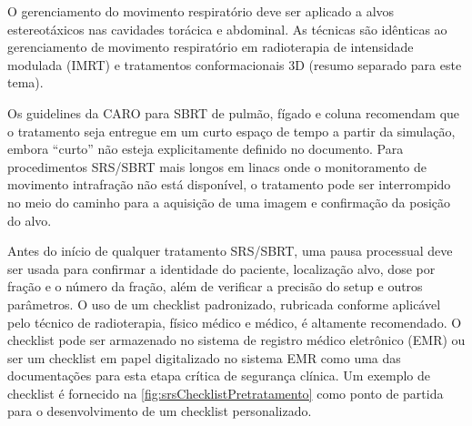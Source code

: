 \documentclass[11pt,a4paper]{article}
\newcounter{exemplo}
\begin{document}
	O gerenciamento do movimento respiratório deve ser aplicado a alvos estereotáxicos nas cavidades torácica e abdominal. As técnicas são idênticas ao gerenciamento de movimento respiratório em radioterapia de intensidade modulada (IMRT) e tratamentos conformacionais 3D (resumo separado para este tema).

	Os guidelines da CARO para SBRT de pulmão, fígado e coluna recomendam que o tratamento seja entregue em um curto espaço de tempo a partir da simulação, embora “curto” não esteja explicitamente definido no documento. Para procedimentos SRS/SBRT mais longos em linacs onde o monitoramento de movimento intrafração não está disponível, o tratamento pode ser interrompido no meio do caminho para a aquisição de uma imagem e confirmação da posição do alvo.

	Antes do início de qualquer tratamento SRS/SBRT, uma pausa processual deve ser usada para confirmar a identidade do paciente, localização alvo, dose por fração e o número da fração, além de verificar a precisão do setup e outros parâmetros. O uso de um checklist padronizado, rubricada conforme aplicável pelo técnico de radioterapia, físico médico e médico, é altamente recomendado. O checklist pode ser armazenado no sistema de registro médico eletrônico (EMR) ou ser um checklist em papel digitalizado no sistema EMR como uma das documentações para esta etapa crítica de segurança clínica. Um exemplo de checklist é fornecido na \ref{fig:srsChecklistPretratamento} como ponto de partida para o desenvolvimento de um checklist personalizado.
\end{document}
